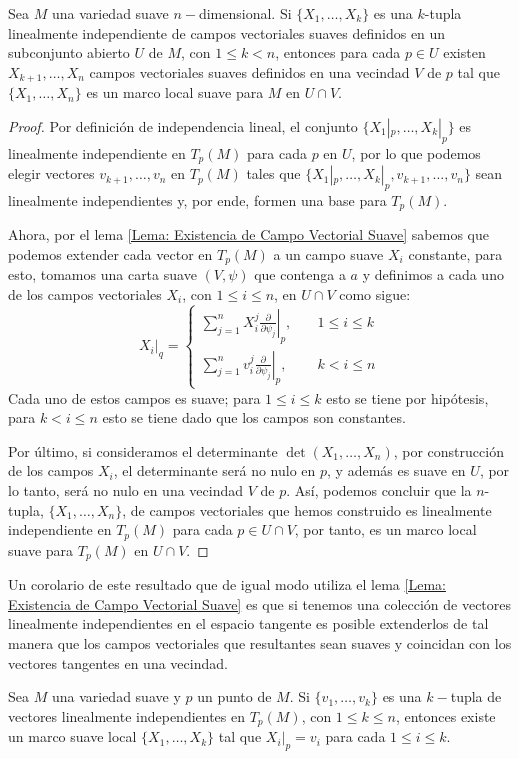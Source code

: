 \begin{theorem}
	Sea $M$ una variedad suave $n-$dimensional. Si $\{X_1, \ldots, X_k\}$ es una $k$-tupla linealmente independiente de campos vectoriales suaves definidos en un subconjunto abierto $U$ de $M$, con $1 \leq k < n$, entonces para cada $p \in U$ existen $X_{k+1},\ldots, X_n$ campos vectoriales suaves definidos en una vecindad $V$ de $p$ tal que $\{X_1, \ldots, X_n\}$ es un marco local suave para $M$ en $U \cap V$.
\end{theorem}

\begin{proof}
	Por definición de independencia lineal, el conjunto $\{X_1|_p, \ldots, X_k|_p\}$ es linealmente independiente en $T_p(M)$ para cada $p$ en $U$, por lo que podemos elegir vectores $v_{k+1},\ldots,v_n$ en $T_p(M)$ tales que $\{X_1|_p, \ldots, X_k|_p, v_{k+1}, \ldots, v_n\}$ sean linealmente independientes y, por ende, formen una base para $T_p(M)$.

  Ahora, por el lema \ref{Lema: Existencia de Campo Vectorial Suave} sabemos que podemos extender cada vector en $T_p(M)$ a un campo suave $X_i$ constante, para esto, tomamos una carta suave $(V,\psi)$ que contenga a $a$ y definimos a cada uno de los campos vectoriales $X_i$, con $1 \leq i \leq n$, en $U \cap V$ como sigue:
	\[
		\left. X_i \right|_q = \begin{cases}
			\sum_{j=1}^{n}
			\left.
			X_i^j \frac{\partial}{\partial \psi_j}
			\right|_p, & \quad 1 \leq i \leq k \\
			\sum_{j=1}^{n}
			\left.
			v_i^j \frac{\partial}{\partial \psi_j}
			\right|_p, & \quad k < i \leq n
		\end{cases}
	\]
	Cada uno de estos campos es suave; para $1 \leq i \leq k$ esto se tiene por hipótesis, para $k< i \leq n$ esto se tiene dado que los campos son constantes.

	Por último, si consideramos el determinante $\det(X_1, \ldots, X_n)$, por construcción de los campos $X_i$, el determinante será no nulo en $p$, y además es suave en $U$, por lo tanto, será no nulo en una vecindad $V$ de $p$. Así, podemos concluir que la $n$-tupla, $\{X_1,\ldots,X_n\}$, de campos vectoriales que hemos construido es linealmente independiente en $T_p(M)$ para cada $p \in U \cap V$, por tanto, es un marco local suave para $T_p(M)$ en $U \cap V$.
\end{proof}

Un corolario de este resultado que de igual modo utiliza el lema \ref{Lema: Existencia de Campo Vectorial Suave} es que si tenemos una colección de vectores linealmente independientes en el espacio tangente es posible extenderlos de tal manera que los campos vectoriales que resultantes sean suaves y coincidan con los vectores tangentes en una vecindad.

\begin{corollary}
  Sea $M$ una variedad suave y $p$ un punto de $M$. Si $\{v_1, \ldots, v_k\}$ es una $k-$tupla de vectores linealmente independientes en $T_p(M)$, con $1 \leq k \leq n$, entonces existe un marco suave local 
  $\{X_1, \ldots, X_k\}$ tal que $X_i|_p = v_i$ para cada $1\leq i \leq k$.
\end{corollary}


